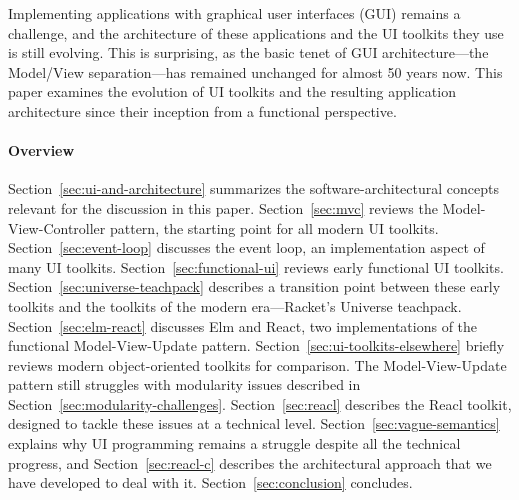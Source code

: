 \documentclass[sigplan,screen]{acmart}
\begin{document}


\maketitle

Implementing applications with graphical user interfaces (GUI) remains
a challenge, and the architecture of these applications and the UI
toolkits they use is still evolving.  This is surprising, as the basic
tenet of GUI architecture---the Model/View separation---has remained
unchanged for almost 50 years now.
This paper examines the evolution of UI toolkits and the resulting
application architecture since their inception from a functional
perspective.

\paragraph{Overview} Section~\ref{sec:ui-and-architecture} summarizes
the software-architectural concepts relevant for the discussion in
this paper.  Section~\ref{sec:mvc} reviews the Model-View-Controller
pattern, the starting point for all modern UI toolkits.
Section~\ref{sec:event-loop} discusses the event loop, an
implementation aspect of many UI toolkits.  Section~\ref{sec:functional-ui} reviews
early functional UI toolkits.  Section~\ref{sec:universe-teachpack}
describes a transition point between these early toolkits and the
toolkits of the modern era---Racket's Universe teachpack.
Section~\ref{sec:elm-react} discusses Elm and React, two
implementations of the functional Model-View-Update pattern.
Section~\ref{sec:ui-toolkits-elsewhere} briefly reviews modern
object-oriented toolkits for comparison.  The Model-View-Update
pattern still struggles with modularity issues described in
Section~\ref{sec:modularity-challenges}.  Section~\ref{sec:reacl}
describes the Reacl toolkit, designed to tackle these issues at a
technical level.  Section~\ref{sec:vague-semantics} explains why UI
programming remains a struggle despite all the technical progress, and
Section~\ref{sec:reacl-c} describes the architectural approach that we
have developed to deal with it.  Section~\ref{sec:conclusion} concludes.
\end{document}
